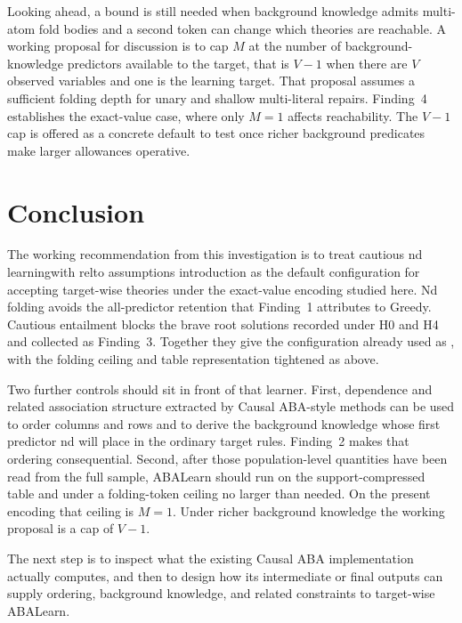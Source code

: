 \documentclass[11pt]{article}
\DeclareRobustCommand{\code}[1]{\texttt{\detokenize{#1}}}
\begin{document}
Looking ahead, a bound is still needed when background knowledge admits
multi-atom fold bodies and a second token can change which theories are
reachable. A working proposal for discussion is to cap \(M\) at the number of
background-knowledge predictors available to the target, that is \(V-1\) when
there are \(V\) observed variables and one is the learning target. That
proposal assumes a sufficient folding depth for unary and shallow multi-literal
repairs. Finding~4 establishes the exact-value case, where only \(M=1\)
affects reachability. The \(V-1\) cap is offered as a concrete default to test
once richer background predicates make larger allowances operative.

\section{Conclusion}

The working recommendation from this investigation is to treat cautious nd learningwith relto assumptions introduction as the default configuration for accepting target-wise theories under
the exact-value encoding studied here. Nd folding avoids the all-predictor
retention that Finding~1 attributes to Greedy. Cautious entailment blocks the
brave root solutions recorded under H0 and H4 and collected as Finding~3. 
Together they give the configuration already used as \code{baseline_cautious},
with the folding ceiling and table representation tightened as above.

Two further controls should sit in front of that learner. First, dependence
and related association structure extracted by Causal ABA-style methods can be
used to order columns and rows and to derive the background knowledge whose
first predictor nd will place in the ordinary target rules. Finding~2 makes
that ordering consequential. Second, after those population-level quantities
have been read from the full sample, ABALearn should run on the
support-compressed table and under a folding-token ceiling no larger than
needed. On the present encoding that ceiling is \(M=1\). Under richer
background knowledge the working proposal is a cap of \(V-1\).

The next step is to inspect what the existing Causal ABA implementation
actually computes, and then to design how its intermediate or final outputs can supply ordering,
background knowledge, and related constraints to target-wise ABALearn.
\end{document}
